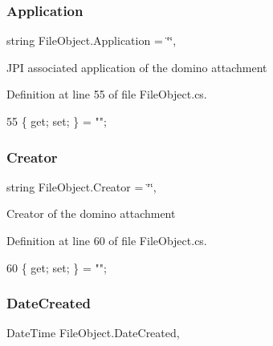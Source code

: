 \subsubsection{\texorpdfstring{Application}{Application}}
{\footnotesize\ttfamily string File\+Object.\+Application = \char`\"{}\char`\"{}\hspace{0.3cm}{\ttfamily [get]}, {\ttfamily [set]}}



J\+PI associated application of the domino attachment 



Definition at line 55 of file File\+Object.\+cs.


\begin{DoxyCode}
55 \{ \textcolor{keyword}{get}; \textcolor{keyword}{set}; \} = \textcolor{stringliteral}{""};
\end{DoxyCode}
\mbox{\label{class_file_object_a1ab7d29c80841b60b276b7430f4e5ec7}} 
\subsubsection{\texorpdfstring{Creator}{Creator}}
{\footnotesize\ttfamily string File\+Object.\+Creator = \char`\"{}\char`\"{}\hspace{0.3cm}{\ttfamily [get]}, {\ttfamily [set]}}



Creator of the domino attachment 



Definition at line 60 of file File\+Object.\+cs.


\begin{DoxyCode}
60 \{ \textcolor{keyword}{get}; \textcolor{keyword}{set}; \} = \textcolor{stringliteral}{""};
\end{DoxyCode}
\mbox{\label{class_file_object_a372b9a7dad068368526b0698550f9504}} 
\subsubsection{\texorpdfstring{Date\+Created}{DateCreated}}
{\footnotesize\ttfamily Date\+Time File\+Object.\+Date\+Created\hspace{0.3cm}{\ttfamily [get]}, {\ttfamily [set]}}



